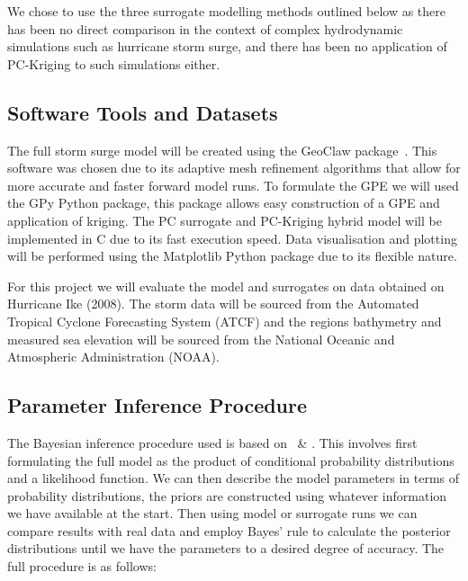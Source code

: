 \documentclass[12pt,a4paper]{article}
\begin{document}
We chose to use the three surrogate modelling methods outlined below as there has been no direct comparison in the context of complex hydrodynamic simulations such as hurricane storm surge, and there has been no application of PC-Kriging to such simulations either.
\subsection{Software Tools and Datasets}
\noindent
The full storm surge model will be created using the GeoClaw package~\cite{clawpack,mandli2016clawpack,geoclaw}. This software was chosen due to its adaptive mesh refinement algorithms that allow for more accurate and faster forward model runs. To formulate the GPE we will used the GPy Python package, this package allows easy construction of a GPE and application of kriging. The PC surrogate and PC-Kriging hybrid model will be implemented in C due to its fast execution speed. Data visualisation and plotting will be performed using the Matplotlib Python package due to its flexible nature.

For this project we will evaluate the model and surrogates on data obtained on Hurricane Ike (2008). The storm data will be sourced from the Automated Tropical Cyclone Forecasting System (ATCF) and the regions bathymetry and measured sea elevation will be sourced from the National Oceanic and Atmospheric Administration (NOAA).
\subsection{Parameter Inference Procedure}
\noindent
The Bayesian inference procedure used is based on~ \& . This involves first formulating the full model as the product of conditional probability distributions and a likelihood function. We can then describe the model parameters in terms of probability distributions, the priors are constructed using whatever information we have available at the start. Then using model or surrogate runs we can compare results with real data and employ Bayes' rule to calculate the posterior distributions until we have the parameters to a desired degree of accuracy. The full procedure is as follows:
\end{document}
